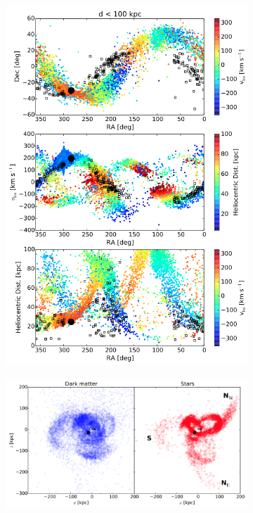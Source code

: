 \begin{figure}
    \centering 

    \begin{subfigure}{0.43\textwidth}
        \centering
        \includegraphics[width=\textwidth]{figs/dierickx2017-10.png}
    \end{subfigure}
    \begin{subfigure}{0.52\textwidth}
        \centering
        \includegraphics[width=\textwidth]{figs/dierickx2017-8.png}

\end{subfigure}
\end{figure}
